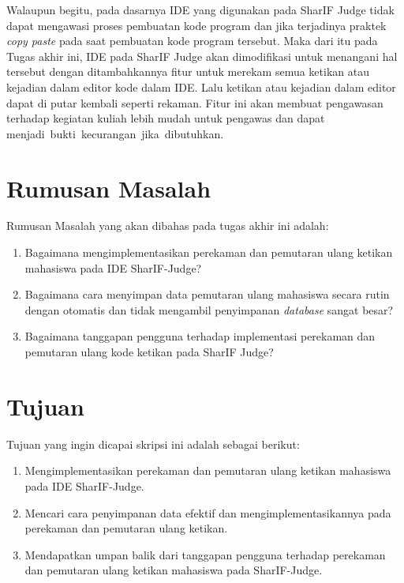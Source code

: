 \documentclass[a4paper,twoside]{article}
\begin{document}
Walaupun begitu, pada dasarnya IDE yang digunakan pada SharIF Judge tidak dapat mengawasi proses pembuatan kode program dan jika terjadinya praktek \textit{copy paste} pada saat pembuatan kode program tersebut. Maka dari itu pada Tugas akhir ini, IDE pada SharIF Judge akan dimodifikasi untuk menangani hal tersebut dengan ditambahkannya fitur untuk merekam semua ketikan atau kejadian dalam editor kode dalam IDE. Lalu ketikan atau kejadian dalam editor dapat di putar kembali seperti rekaman. Fitur ini akan membuat pengawasan terhadap kegiatan kuliah lebih mudah untuk pengawas dan dapat \mbox{menjadi bukti kecurangan jika dibutuhkan.}

\newpage

\section{Rumusan Masalah}

Rumusan Masalah yang akan dibahas pada tugas akhir ini adalah:
\begin{enumerate}
	\item Bagaimana mengimplementasikan perekaman dan pemutaran ulang ketikan mahasiswa pada IDE SharIF-Judge?
	\item Bagaimana cara menyimpan data pemutaran ulang mahasiswa secara rutin dengan otomatis dan tidak mengambil penyimpanan \textit{database} sangat besar?
	\item Bagaimana tanggapan pengguna terhadap implementasi perekaman dan pemutaran ulang kode ketikan pada SharIF Judge?
\end{enumerate}

\section{Tujuan}

Tujuan yang ingin dicapai skripsi ini adalah sebagai berikut:
\begin{enumerate}
	\item Mengimplementasikan perekaman dan pemutaran ulang ketikan mahasiswa pada IDE SharIF-Judge.
	\item Mencari cara penyimpanan data efektif dan mengimplementasikannya pada perekaman dan pemutaran ulang ketikan.
	\item Mendapatkan umpan balik dari tanggapan pengguna terhadap perekaman dan pemutaran ulang ketikan mahasiswa pada SharIF-Judge.
\end{enumerate}
\end{document}
